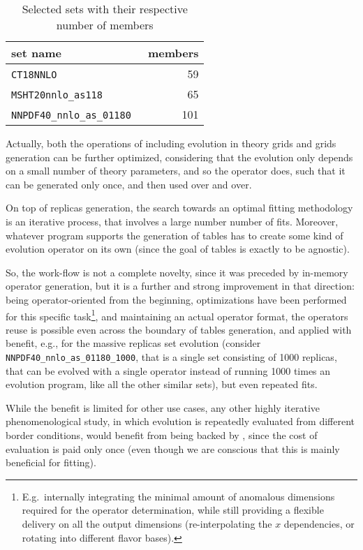 \begin{table}
    \centering
    \begin{tabular}{lr}
        \pdf{} set name & members \\
        \hline
        \texttt{CT18NNLO}~\cite{Hou:2019efy} & 59\\
        \texttt{MSHT20nnlo\_as118}~\cite{Bailey:2020ooq} & 65\\
        \texttt{NNPDF40\_nnlo\_as\_01180}~\cite{NNPDF:2021njg} & 101
    \end{tabular}
    \caption{Selected \pdf{} sets with their respective number of members}
    \label{tab:pdfmem}
\end{table}

Actually, both the operations of including evolution in theory grids and \pdf{}
grids generation can be further optimized, considering that the evolution only
depends on a small number of theory parameters, and so the operator does, such
that it can be generated only once, and then used over and over.

On top of replicas generation, the search towards an optimal fitting
methodology is an iterative process, that involves a large number number of fits.
Moreover, whatever program supports the generation of \fk{} tables has to
create some kind of evolution operator on its own (since the goal of \fk{}
tables is exactly to be \pdf{} agnostic).

So, the \eko{} work-flow is not a complete novelty, since it was preceded by
\apfel{} in-memory operator generation, but it is a further and strong
improvement in that direction: being operator-oriented from the beginning,
optimizations have been performed for this specific task\footnote{
E.g.\ internally integrating the minimal amount of anomalous dimensions required
for the operator determination, while still providing a flexible delivery on
all the output dimensions (re-interpolating the $x$ dependencies, or rotating
into different flavor bases).
}, and maintaining an
actual operator format, the operators reuse is possible even across the
boundary of \fk{} tables generation, and applied with benefit, e.g., for the
massive replicas set evolution (consider
\texttt{NNPDF40\_nnlo\_as\_01180\_1000}, that is a single set consisting of
1000 replicas, that can be evolved with a single operator instead of running
1000 times an evolution program, like all the other similar sets), but even
repeated fits.

While the benefit is limited for other use cases, any other highly iterative
phenomenological study, in which \pdf{} evolution is repeatedly evaluated from
different border conditions, would benefit from being backed by \eko{}, since
the cost of \dglap{} evaluation is paid only once (even though we are conscious
that this is mainly beneficial for \pdf{} fitting).

